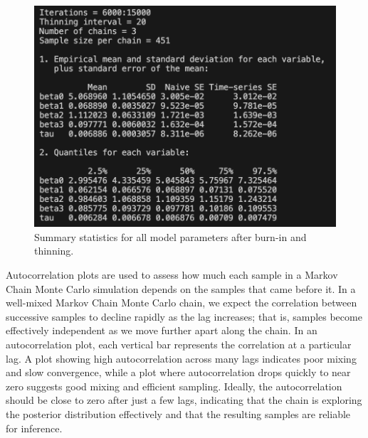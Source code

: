 \documentclass[]{article}
\begin{document}
\begin{figure}[H]
	\centering
	\includegraphics[width=0.7\linewidth]{img/img-summary}
	\caption{Summary statistics for all model parameters after burn-in and thinning.}	
	\label{fig:img-summary}
\end{figure}


Autocorrelation plots are used to assess how much each sample in a Markov Chain Monte Carlo simulation depends on the samples that came before it. In a well-mixed Markov Chain Monte Carlo chain, we expect the correlation between successive samples to decline rapidly as the lag increases; that is, samples become effectively independent as we move further apart along the chain. In an autocorrelation plot, each vertical bar represents the correlation at a particular lag. A plot showing high autocorrelation across many lags indicates poor mixing and slow convergence, while a plot where autocorrelation drops quickly to near zero suggests good mixing and efficient sampling. Ideally, the autocorrelation should be close to zero after just a few lags, indicating that the chain is exploring the posterior distribution effectively and that the resulting samples are reliable for inference.
\end{document}
